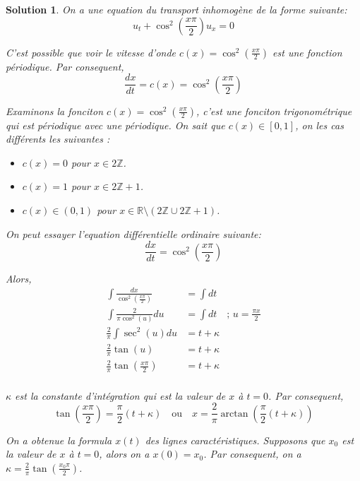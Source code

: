 \documentclass[10pt]{article}
\theoremstyle{frenchstyle}
\newtheorem{solution}{Solution}
\newcommand{\R}{\mathbb{R}}
\newcommand{\Z}{\mathbb{Z}}
\begin{document}
\begin{solution}
	On a une equation du transport inhomogène de la forme suivante:
	\[
		u_t + \cos^2\left(\frac{x\pi}{2}\right)u_x = 0
	\]

	C'est possible que voir le vitesse d'onde $c(x) = \cos^2\left(\frac{x\pi}{2}\right)$ est une fonction périodique. Par consequent,
	\[
		\frac{dx}{dt} = c(x) = \cos^2\left(\frac{x\pi}{2}\right)
	\]

	Examinons la fonciton $c(x) = \cos^2\left(\frac{x\pi}{2}\right)$, c'est une fonciton trigonométrique qui est périodique avec une périodique.  On sait que $c(x) \in [0,1]$, on les cas différents les suivantes :
	\begin{itemize}
		\item $c(x) = 0$ pour $x \in 2\Z$.
		\item $c(x) = 1$ pour $x \in 2\Z + 1$.
		\item $c(x) \in (0,1)$ pour $x \in \R \setminus \left( 2\Z \cup 2\Z + 1 \right)$.
	\end{itemize}

	On peut essayer l'equation différentielle ordinaire suivante:
	\[
		\frac{dx}{dt} = \cos^2\left(\frac{x\pi}{2}\right)
	\]

	Alors,
	\begin{align*}
		\int \frac{dx}{\cos^2\left(\frac{x\pi}{2}\right)} & = \int dt                                      \\
		\int \frac{2}{\pi \cos^2(u)} du                   & = \int dt \quad \textit{; $u=\frac{\pi x}{2}$} \\
		\frac{2}{\pi} \int \sec^2(u) du                   & = t + \kappa                                   \\
		\frac{2}{\pi} \tan(u)                             & = t + \kappa                                   \\
		\frac{2}{\pi} \tan\left(\frac{x\pi}{2}\right)     & = t + \kappa                                   \\
	\end{align*}

	$\kappa$ est la constante d'intégration qui est la valeur de $x$ à $t=0$. Par consequent,
	\[
		\tan(\frac{x\pi}{2}) = \frac{\pi}{2}(t + \kappa) \quad \text{ou} \quad x = \frac{2}{\pi}\arctan\left(\frac{\pi}{2}(t + \kappa)\right)
	\]

	On a obtenue la formula $x(t)$ des lignes caractéristiques. Supposons que $x_0$ est la valeur de $x$ à $t=0$, alors on a $x(0) = x_0$. Par consequent, on a $\kappa = \frac{2}{\pi}\tan\left(\frac{x_0\pi}{2}\right)$.


\end{solution}
\end{document}
